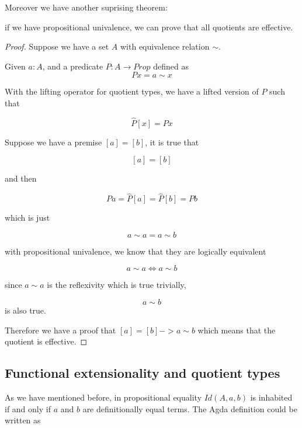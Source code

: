 







Moreover we have another suprising theorem:

\begin{theorem}
if we have propositional univalence, we can prove that all
quotients are effective.
\end{theorem}

\begin{proof}
Suppose we have a set $A$ with equivalence relation $\sim$.

Given $a : A$, and a predicate $P : A \rightarrow Prop$ defined as 
$$P x = a \sim x$$

With the lifting operator for quotient types,
we have a lifted version of $P$ such that

$$\hat{P} [ x ] =  P x$$

Suppose we have a premise $[ a ] = [ b ]$, it is true that

$$[ a ] = [ b ]$$

and then

$$P a = \hat{P} [ a ] = \hat{P} [ b ] = P b$$

which is just

$$a \sim a = a \sim b$$

with propositional univalence, we know that they are logically equivalent

$$a \sim a \iff a \sim b$$

since $a \sim a$ is the reflexivity which is true trivially,

$$ a \sim b$$ is also true.

Therefore we have a proof that $[ a ] = [ b ] -> a \sim b$ which means
that the quotient is effective.
\end{proof}


\subsection{Functional extensionality and quotient types}

As we have mentioned before, in \itt{} propositional equality $Id(A,a,b)$ is inhabited
if and only if $a$ and $b$ are definitionally equal terms. The Agda
definition could be written as

